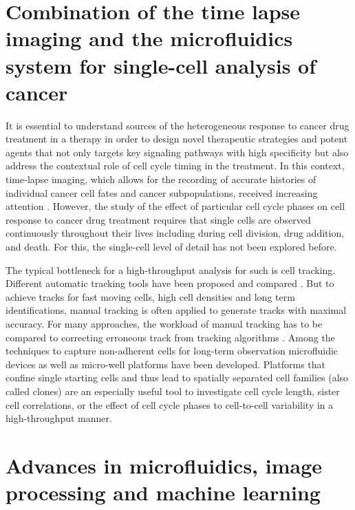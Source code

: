 \documentclass[pdftex,12pt,a4paper]{report}
\begin{document}
\section{Combination of the time lapse imaging and the microfluidics system for single-cell analysis of cancer}

It is essential to understand sources of the heterogeneous response to cancer drug treatment in a therapy in order to design novel therapeutic strategies and potent agents that not only targets key signaling pathways with high specificity but also address the contextual role of cell cycle timing in the treatment. In this context, time-lapse imaging, which allows for the recording of accurate histories of individual cancer cell fates and cancer subpopulations, received increasing attention \cite{gascoigne2008cancer, hawkins2009single, aftab2014label}. However, the study of the effect of particular cell cycle phases on cell response to cancer drug treatment requires that single cells are observed continuously throughout their lives including during cell division, drug addition, and death. For this, the single-cell level of detail has not been explored before.

The typical bottleneck for a high-throughput analysis for such is cell tracking. Different automatic tracking tools have been proposed \cite{doh2010cell, zurgil2010polymer} and compared \cite{skylaki2016challenges, wlodkowic2009microfluidic}. But to achieve tracks for fast moving cells, high cell densities and long term identifications, manual tracking is often applied \cite{rettig2005large, zurgil2010polymer} to generate tracks with maximal accuracy. For many approaches, the workload of manual tracking has to be compared to correcting erroneous track from tracking algorithms \cite{skylaki2016challenges}. Among the techniques to capture non-adherent cells for long-term observation microfluidic devices \cite{wlodkowic2009microfluidic} as well as micro-well platforms \cite{rettig2005large, doh2010cell, zurgil2010polymer, zaretsky2012monitoring, day2009method, schiffenbauer2009cell} have been developed. Platforms that confine single starting cells and thus lead to spatially separated cell families (also called clones) are an especially useful tool to investigate cell cycle length, sister cell correlations, or the effect of cell cycle phases to cell-to-cell variability in a high-throughput manner.

\section{Advances in microfluidics, image processing and machine learning}
\end{document}
